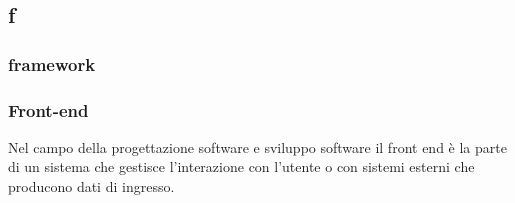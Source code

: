 \subsection*{\textbf{\hfill \Huge{f} \hfill}} 
\subsubsection*{framework}

\subsubsection*{Front-end}
Nel campo della progettazione software e sviluppo software il front end è la parte di un sistema che gestisce l’interazione con l’utente o con sistemi esterni che producono dati di ingresso.

